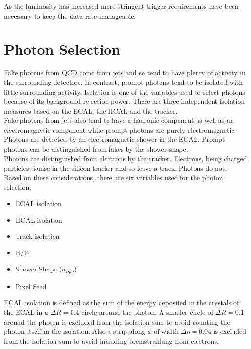 As the luminosity has increased more stringent trigger requirements have been 
necessary to keep the data rate manageable. 

\section{Photon Selection}

Fake photons from QCD come from jets and so tend to have plenty of activity in
the surrounding detectors. In contrast, prompt photons tend to be isolated with
little surrounding activity. Isolation is one of the variables used to select 
photons because of its background rejection power. There are three independent 
isolation measures based on the ECAL, the HCAL and the tracker. \\

Fake photons from jets also tend to have a hadronic component as well as an
electromagnetic component while prompt photons are purely electromagnetic. \\ 

Photons are detected by an electromagnetic shower in the ECAL. Prompt photons
can be distinguished from fakes by the shower shape. \\

Photons are distinguished from electrons by the tracker. Electrons, being
charged particles, ionise in the silicon tracker and so leave a track. Photons
do not. \\ 

Based on these considerations, there are six variables used for the photon 
selection:

\begin{itemize}
\item ECAL isolation
\item HCAL isolation
\item Track isolation
\item H/E
\item Shower Shape ($\sigma_{i\eta i\eta}$)
\item Pixel Seed
\end{itemize}

ECAL isolation is defined as the sum of the energy deposited in the crystals of 
the ECAL in a $\Delta R = 0.4$ circle around the photon. A smaller circle of 
$\Delta R = 0.1$ around the photon is excluded from the isolation sum to avoid 
counting the photon itself in the isolation. Also a strip along $\phi$ of width 
$\Delta \eta = 0.04$ is excluded from the isolation sum to avoid including 
bremstrahlung from electrons. \\

